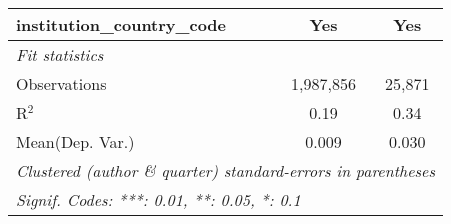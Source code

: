 \begin{tabular}{lcc}
   institution\_country\_code                                 & Yes            & Yes\\  
   \midrule
   \emph{Fit statistics}\\
   Observations                                               & 1,987,856      & 25,871\\  
   R$^2$                                                      & 0.19           & 0.34\\  
Mean(Dep. Var.) & 0.009 & 0.030 \\
   \midrule \midrule
   \multicolumn{3}{l}{\emph{Clustered (author \& quarter) standard-errors in parentheses}}\\
   \multicolumn{3}{l}{\emph{Signif. Codes: ***: 0.01, **: 0.05, *: 0.1}}\\
\end{tabular}
\par\endgroup
